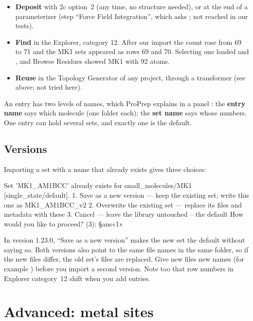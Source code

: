 \begin{itemize}
  \item \textbf{Deposit} with 2c option~2 (any time, no structure needed), or
        at the end of a parameterizer (step ``Force Field Integration'', which
        asks ; not reached in our tests).
  \item \textbf{Find} in the Explorer, category 12. After our import the
        count rose from 69 to 71 and the MK1 sets appeared as rows 69 and
        70. Selecting one loaded  and ,
        and Browse Residues showed MK1 with 92 atoms.
  \item \textbf{Reuse} in the Topology Generator of any project, through a
        transformer (see above; not tried here).
\end{itemize}

An entry has two levels of names, which ProPrep explains in a panel
: the \textbf{entry name} says which molecule
(one folder each); the \textbf{set name} says whose numbers. One entry can
hold several sets, and exactly one is the default.

\subsection*{Versions}

Importing a set with a name that already exists gives three choices:

\begin{screen}
Set 'MK1_AM1BCC' already exists for small_molecules/MK1 [single_state/default].
  1. Save as a new version — keep the existing set; write this one as MK1_AM1BCC_v2
  2. Overwrite the existing set — replace its files and metadata with these
  3. Cancel — leave the library untouched -- the default
How would you like to proceed? (3): §ans«1»
\end{screen}

\begin{watchout}
In version 1.23.0, ``Save as a new version'' makes the new set the default
without saying so. Both versions also point to the same file names in the
same folder, so if the new files differ, the old set's files are replaced.
Give new files new names (for example ) before you
import a second version. Note too that row numbers in Explorer category~12
shift when you add entries.
\end{watchout}

\section{Advanced: metal sites}
\label{sec:forcefields-metal}

